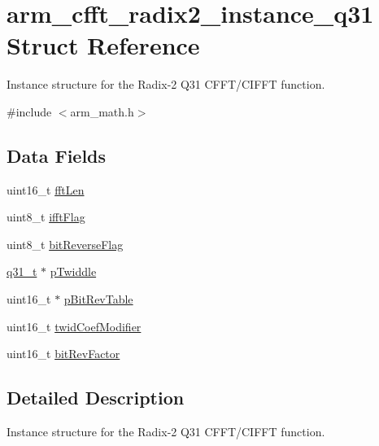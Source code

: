 \hypertarget{structarm__cfft__radix2__instance__q31}{}\section{arm\+\_\+cfft\+\_\+radix2\+\_\+instance\+\_\+q31 Struct Reference}
\label{structarm__cfft__radix2__instance__q31}


Instance structure for the Radix-\/2 Q31 C\+F\+F\+T/\+C\+I\+F\+FT function.  




{\ttfamily \#include $<$arm\+\_\+math.\+h$>$}

\subsection*{Data Fields}
\begin{DoxyCompactItemize}
\item 
uint16\+\_\+t \hyperlink{structarm__cfft__radix2__instance__q31_ab8db3bbe7c61e6bb8ca2a55e3446e11a}{fft\+Len}
\item 
uint8\+\_\+t \hyperlink{structarm__cfft__radix2__instance__q31_ad6ca6e223f986ebfd94c5ee1e410aa73}{ifft\+Flag}
\item 
uint8\+\_\+t \hyperlink{structarm__cfft__radix2__instance__q31_a09a221a818c6d0e064557a99e2fe9a8b}{bit\+Reverse\+Flag}
\item 
\hyperlink{arm__math_8h_adc89a3547f5324b7b3b95adec3806bc0}{q31\+\_\+t} $\ast$ \hyperlink{structarm__cfft__radix2__instance__q31_a2505b7d5ec077b244c712797a5253b6d}{p\+Twiddle}
\item 
uint16\+\_\+t $\ast$ \hyperlink{structarm__cfft__radix2__instance__q31_a46a2fb328199897af100fea0bfdf59aa}{p\+Bit\+Rev\+Table}
\item 
uint16\+\_\+t \hyperlink{structarm__cfft__radix2__instance__q31_afe772e5b5001c9d8e85032115a8df5bf}{twid\+Coef\+Modifier}
\item 
uint16\+\_\+t \hyperlink{structarm__cfft__radix2__instance__q31_a33386d95319dc3ee7097b3a8e52e01ec}{bit\+Rev\+Factor}
\end{DoxyCompactItemize}


\subsection{Detailed Description}
Instance structure for the Radix-\/2 Q31 C\+F\+F\+T/\+C\+I\+F\+FT function. 

